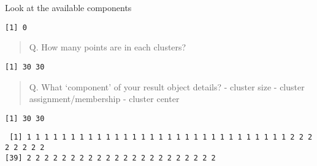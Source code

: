 \documentclass[
  letterpaper,
  DIV=11,
  numbers=noendperiod]{scrartcl}
\newenvironment{Shaded}{\begin{snugshade}}{\end{snugshade}}
\newcommand{\NormalTok}[1]{\textcolor[rgb]{0.00,0.23,0.31}{#1}}
\newcommand{\SpecialCharTok}[1]{\textcolor[rgb]{0.37,0.37,0.37}{#1}}
\begin{document}
Look at the available components

\begin{Shaded}
\end{Shaded}

\begin{verbatim}
[1] 0
\end{verbatim}

\begin{quote}
Q. How many points are in each clusters?
\end{quote}

\begin{Shaded}
\end{Shaded}

\begin{verbatim}
[1] 30 30
\end{verbatim}

\begin{quote}
Q. What `component' of your result object details? - cluster size -
cluster assignment/membership - cluster center
\end{quote}

\begin{Shaded}
\end{Shaded}

\begin{verbatim}
[1] 30 30
\end{verbatim}

\begin{Shaded}
\end{Shaded}

\begin{verbatim}
 [1] 1 1 1 1 1 1 1 1 1 1 1 1 1 1 1 1 1 1 1 1 1 1 1 1 1 1 1 1 1 1 2 2 2 2 2 2 2 2
[39] 2 2 2 2 2 2 2 2 2 2 2 2 2 2 2 2 2 2 2 2 2 2
\end{verbatim}

\begin{Shaded}
\end{Shaded}
\end{document}
